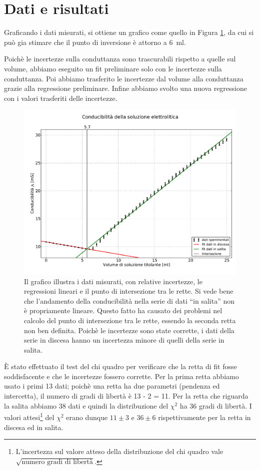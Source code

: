 \section*{Dati e risultati}

Graficando i dati misurati, si ottiene un grafico come quello in Figura \ref{fig:meas}, da cui si può gia stimare
che il punto di inversione è attorno a \SI{6}{\milli\litre}.

Poichè le incertezze sulla conduttanza sono trascurabili rispetto a quelle sul volume, abbiamo eseguito un fit preliminare
solo con le incertezze sulla conduttanza. Poi abbiamo trasferito le incertezze dal volume alla conduttanza grazie alla regressione preliminare.
Infine abbiamo svolto una nuova regressione con i valori trasferiti delle incertezze. 

\begin{figure}
    \includegraphics[scale=0.5]{Rette_von_Fitt.pdf}
    \caption{Il grafico illustra i dati  misurati, con relative incertezze, le regressioni lineari
        e il punto di intersezione tra le rette. Si vede bene che l'andamento della conducibilità
        nella serie di dati ``in salita'' non è propriamente lineare.
        Questo fatto ha causato dei problemi nel calcolo del punto di intersezione tra le rette,
        essendo la seconda retta non ben definita.
        Poichè le incertezze sono state corrette, i dati della serie
        in discesa hanno un incertezza minore di quelli della serie in salita.}
    \label{fig:meas}
\end{figure}

\`E stato effettuato il test del chi quadro per verificare che la retta di fit fosse soddisfacente e che le incertezze fossero corrette.
Per la prima retta abbiamo usato i primi 13 dati; poichè una retta ha due parametri (pendenza ed intercetta),
il numero di gradi di libertà è 13 - 2 = 11. Per la retta che riguarda la salita abbiamo 38 dati e quindi la distribuzione del $\chi^2$ ha 36 gradi di libertà.
I valori attesi\footnote{L'incertezza sul valore atteso della distribuzione del chi quadro vale $\sqrt{\text{numero gradi di libertà}}$.} del $\chi^2$ erano
dunque $11 \pm 3$ e $36 \pm 6$ rispettivamente per la retta in discesa ed in salita.

